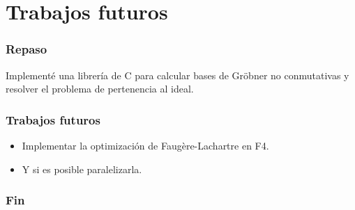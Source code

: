 \documentclass[spanish, aspectratio=169, hidecontrols]{beamer}
\newcommand\cpp{C\nolinebreak[4]\hspace{-.05em}\raisebox{.4ex}{\relsize{-3}{\textbf{++}}}\xspace}
\begin{document}
\section{Trabajos futuros}

\begin{frame}
  \frametitle{Repaso}
  Implementé una librería de \cpp para calcular bases de Gröbner no conmutativas y resolver el problema de pertenencia al ideal.
\end{frame}

\begin{frame}
  \frametitle{Trabajos futuros}
  \begin{itemize}
    \item Implementar la optimización de Faugère-Lachartre en F4.
    \item Y si es posible paralelizarla.
  \end{itemize}
\end{frame}

\appendix

\begin{frame}
  \frametitle{Fin}
\end{frame}
\end{document}
